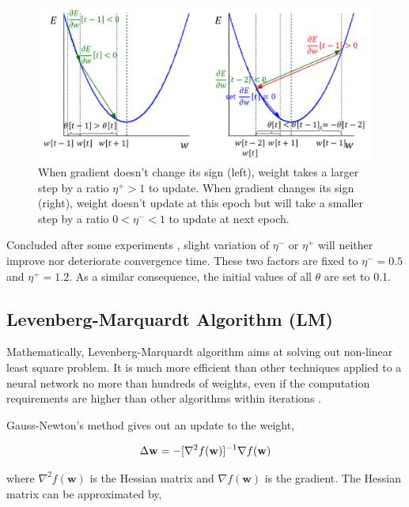 \documentclass[procedia]{easychair}
\begin{document}
\begin{figure}[h]
    \begin{centering}
        \includegraphics[scale=0.5]{../../pic/rp.png}
        \caption{When gradient doesn’t change its sign (left), weight takes a larger step by a ratio $\eta ^ + > 1$ to update.  When gradient changes its sign (right), weight doesn’t update at this epoch but will take a smaller step by a ratio $0 < \eta ^ - < 1$ to update at next epoch.}
        \label{fig:rp}
	\end{centering}
\end{figure}

Concluded after some experiments \cite{riedmiller1993direct}, slight variation of $\eta ^ -$ or $\eta ^ +$ will neither improve nor deteriorate convergence time.  These two factors are fixed to $\eta ^ - = 0.5$ and $\eta ^ + = 1.2$.  As a similar consequence, the initial values of all $\theta$ are set to 0.1.

\subsection{Levenberg-Marquardt Algorithm (LM)}

Mathematically, Levenberg-Marquardt algorithm aims at solving out non-linear least square problem.  It is much more efficient than other techniques applied to a neural network no more than hundreds of weights, even if the computation requirements are higher than other algorithms within iterations \cite{hagan1994training}.

Gauss-Newton’s method gives out an update to the weight,

\begin{equation}
    \Delta \mathbf{w} = - [ \nabla ^ 2 f( \mathbf{w} ) ] ^ {-1} \nabla f( \mathbf{w} ) \notag
\end{equation}

where $\nabla ^ 2 f( \mathbf{w} )$ is the Hessian matrix and $\nabla f( \mathbf{w} )$ is the gradient.  The Hessian matrix can be approximated by,
\end{document}
